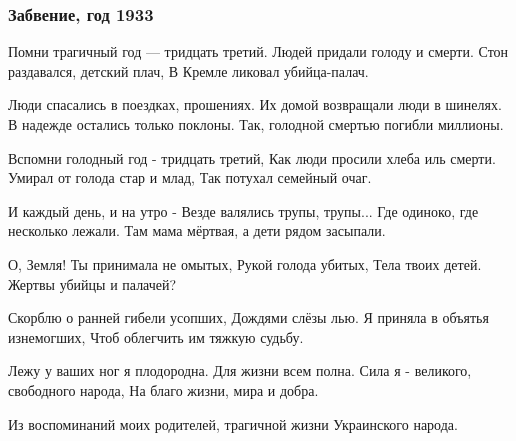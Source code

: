  
 
 

\subsubsection{Забвение, год 1933}

Помни трагичный год — тридцать третий.
Людей придали голоду и смерти.
Стон раздавался, детский плач,
В Кремле ликовал убийца-палач.

Люди спасались в поездках, прошениях.
Их домой возвращали люди в шинелях.
В надежде остались только поклоны.
Так, голодной смертью погибли миллионы.

Вспомни голодный год - тридцать третий,
Как люди просили хлеба иль смерти.
Умирал от голода стар и млад,
Так потухал семейный очаг.

И каждый день, и на утро -
Везде валялись трупы, трупы...
Где одиноко, где несколько лежали.
Там мама мёртвая, а дети рядом засыпали.

О, Земля! Ты принимала не омытых,
Рукой голода убитых,
Тела твоих детей.
Жертвы убийцы и палачей?

Скорблю о ранней гибели усопших,
Дождями слёзы лью.
Я приняла в объятья изнемогших,
Чтоб облегчить им тяжкую судьбу.

Лежу у ваших ног я плодородна.
Для жизни всем полна.
Сила я - великого, свободного народа,
На благо жизни, мира и добра.

Из воспоминаний моих родителей, трагичной жизни Украинского народа.

